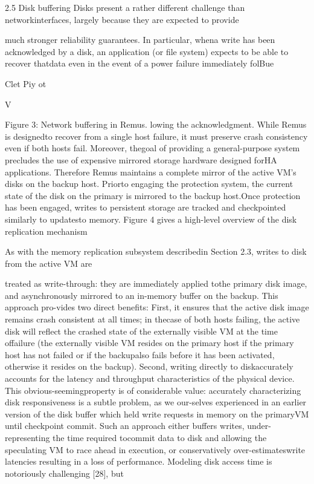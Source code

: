 2.5 Disk buffering
Disks present a rather different challenge than networkinterfaces, largely because they are expected to provide

much stronger reliability guarantees. In particular, whena write has been acknowledged by a disk, an application (or file system) expects to be able to recover thatdata even in the event of a power failure immediately folBu\Gamma \Gamma e\Delta 

Cl\Theta e\Lambda t
P\Delta \Theta i\Xi \Delta y \Pi o\Sigma t

V\Upsilon 

Figure 3: Network buffering in Remus.
lowing the acknowledgment. While Remus is designedto recover from a single host failure, it must preserve
crash consistency even if both hosts fail. Moreover, thegoal of providing a general-purpose system precludes the
use of expensive mirrored storage hardware designed forHA applications. Therefore Remus maintains a complete
mirror of the active VM's disks on the backup host. Priorto engaging the protection system, the current state of
the disk on the primary is mirrored to the backup host.Once protection has been engaged, writes to persistent
storage are tracked and checkpointed similarly to updatesto memory. Figure 4 gives a high-level overview of the
disk replication mechanism

As with the memory replication subsystem describedin Section 2.3, writes to disk from the active VM are

treated as write-through: they are immediately applied tothe primary disk image, and asynchronously mirrored to
an in-memory buffer on the backup. This approach pro-vides two direct benefits: First, it ensures that the active
disk image remains crash consistent at all times; in thecase of both hosts failing, the active disk will reflect the
crashed state of the externally visible VM at the time offailure (the externally visible VM resides on the primary
host if the primary host has not failed or if the backupalso fails before it has been activated, otherwise it resides on the backup). Second, writing directly to diskaccurately accounts for the latency and throughput characteristics of the physical device. This obvious-seemingproperty is of considerable value: accurately characterizing disk responsiveness is a subtle problem, as we our-selves experienced in an earlier version of the disk buffer
which held write requests in memory on the primaryVM until checkpoint commit. Such an approach either
buffers writes, under-representing the time required tocommit data to disk and allowing the speculating VM to
race ahead in execution, or conservatively over-estimateswrite latencies resulting in a loss of performance. Modeling disk access time is notoriously challenging [28], but

